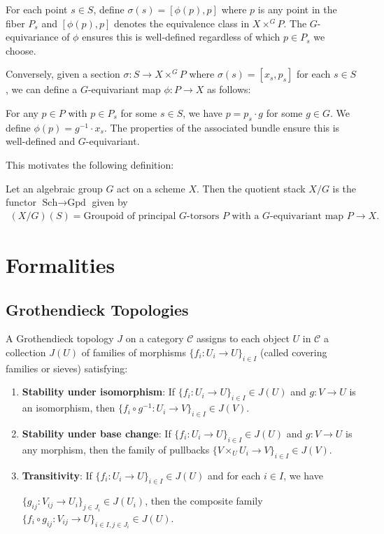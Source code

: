 \documentclass[12pt]{article}
\begin{document}
For each point $s \in S$, define $\sigma(s) = [\phi(p), p]$ where $p$ is any point in the fiber $P_s$ and $[\phi(p), p]$ denotes the equivalence class in $X \times^G P$. The $G$-equivariance of $\phi$ ensures this is well-defined regardless of which $p \in P_s$ we choose.


Conversely, given a section $\sigma: S \to X \times^G P$ where $\sigma(s) = [x_s, p_s]$ for each $s \in S$, we can define a $G$-equivariant map $\phi: P \to X$ as follows:

For any $p \in P$ with $p \in P_s$ for some $s \in S$, we have $p = p_s \cdot g$ for some $g \in G$. We define $\phi(p) = g^{-1} \cdot x_s$. The properties of the associated bundle ensure this is well-defined and $G$-equivariant.

This motivates the following definition:
\begin{definition}
    Let an algebraic group $G$ act on a scheme $X$. Then the quotient stack $X/G$ is the functor $\text{Sch} \to \text{Gpd}$ given by
    \begin{align*}
        (X/G)(S) = \text{Groupoid of principal $G$-torsors $P$ with a $G$-equivariant map $P \to X$}.
    \end{align*}
\end{definition}

\section{Formalities}
\subsection{Grothendieck Topologies}

\begin{definition}
    A Grothendieck topology $J$ on a category $\mathcal{C}$ assigns to each object $U$ in $\mathcal{C}$ a collection $J(U)$ of families of morphisms $\{f_i: U_i \to U\}_{i \in I}$ (called covering families or sieves) satisfying:

    \begin{enumerate}
        \item \textbf{Stability under isomorphism}: If $\{f_i: U_i \to U\}_{i \in I} \in J(U)$ and $g: V \to U$ is an isomorphism, then $\{f_i \circ g^{-1}: U_i \to V\}_{i \in I} \in J(V)$.

        \item \textbf{Stability under base change}: If $\{f_i: U_i \to U\}_{i \in I} \in J(U)$ and $g: V \to U$ is any morphism, then the family of pullbacks $\{V \times_U U_i \to V\}_{i \in I} \in J(V)$.

        \item \textbf{Transitivity}: If $\{f_i: U_i \to U\}_{i \in I} \in J(U)$ and for each $i \in I$, we have

              $\{g_{ij}: V_{ij} \to U_i\}_{j \in J_i} \in J(U_i)$, then the composite family $\{f_i \circ g_{ij}: V_{ij} \to U\}_{i \in I, j \in J_i} \in J(U)$.
    \end{enumerate}
\end{definition}
\end{document}
